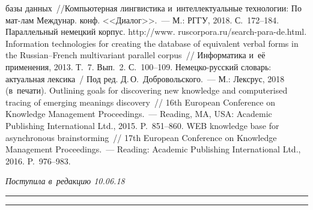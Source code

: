 \begin{multicols}{2}
{{\begin{thebibliography}{99}
базы данных~//\linebreak Компьютерная лингвистика и~интеллектуальные технологии: 
По мат-лам Междунар. конф. <<Диалог>>.~--- М.: РГГУ, 2018. С.~172--184.
Параллельный немецкий корпус. {\sf http://www. ruscorpora.ru/search-para-de.html}.
 Information 
technologies for creating the database of equivalent verbal forms in the  
Russian--French multivariant parallel corpus~// Информатика и~её применения, 
2013. Т.~7. Вып.~2. С.~100--109.
Немецко-русский словарь: актуальная лексика~/ Под ред. 
Д.\,О.~Добровольского.~--- М.: Лексрус, 2018 (в~печати).
 Outlining goals for discovering new knowledge and 
computerised tracing of emerging meanings discovery~// 16th European Conference 
on Knowledge Management Proceedings.~--- Reading, MA, USA: Academic Publishing 
International Ltd., 2015. P.~851--860.
 WEB knowledge 
base for asynchronous brainstorming~// 17th European Conference on Knowledge 
Management Proceedings.~--- Reading: Academic Publishing International Ltd., 
2016. P.~976--983.

 \end{thebibliography}

 }
 }

\end{multicols}

\vspace*{-6pt}

\hfill{\small\textit{Поступила в~редакцию 10.06.18}}

\vspace*{6pt}



\hrule

\vspace*{2pt}

\hrule

\vspace*{-2pt}


\def\tit{IMPLIED KNOWLEDGE: FOUNDATIONS AND~TECHNOLOGIES OF~EXPLICATION}



\def\titkol{Implied knowledge: Foundations and~technologies of~explication}

\def\aut{I.\,M.~Zatsman}

